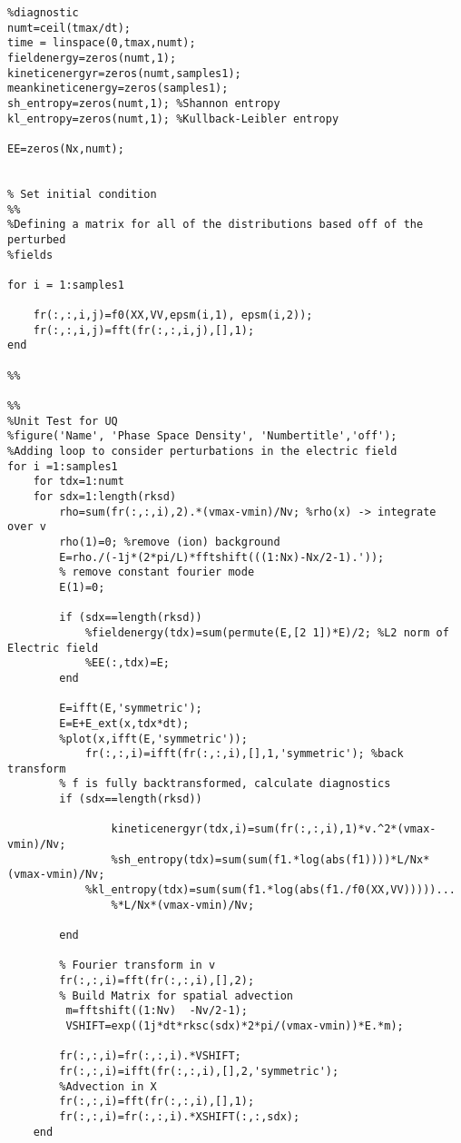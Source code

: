 \documentclass{article}
\begin{document}
\begin{lstlisting}
%diagnostic
numt=ceil(tmax/dt);
time = linspace(0,tmax,numt);
fieldenergy=zeros(numt,1);
kineticenergyr=zeros(numt,samples1);
meankineticenergy=zeros(samples1);
sh_entropy=zeros(numt,1); %Shannon entropy
kl_entropy=zeros(numt,1); %Kullback-Leibler entropy

EE=zeros(Nx,numt);


% Set initial condition
%%
%Defining a matrix for all of the distributions based off of the perturbed
%fields

for i = 1:samples1
   
    fr(:,:,i,j)=f0(XX,VV,epsm(i,1), epsm(i,2));
    fr(:,:,i,j)=fft(fr(:,:,i,j),[],1); 
end

%%

%%
%Unit Test for UQ
%figure('Name', 'Phase Space Density', 'Numbertitle','off');
%Adding loop to consider perturbations in the electric field
for i =1:samples1
    for tdx=1:numt
    for sdx=1:length(rksd)
        rho=sum(fr(:,:,i),2).*(vmax-vmin)/Nv; %rho(x) -> integrate over v
        rho(1)=0; %remove (ion) background
        E=rho./(-1j*(2*pi/L)*fftshift(((1:Nx)-Nx/2-1).'));
        % remove constant fourier mode
        E(1)=0;

        if (sdx==length(rksd))
            %fieldenergy(tdx)=sum(permute(E,[2 1])*E)/2; %L2 norm of Electric field
            %EE(:,tdx)=E;
        end

        E=ifft(E,'symmetric');
        E=E+E_ext(x,tdx*dt);
        %plot(x,ifft(E,'symmetric'));
            fr(:,:,i)=ifft(fr(:,:,i),[],1,'symmetric'); %back transform
        % f is fully backtransformed, calculate diagnostics
        if (sdx==length(rksd))
            
                kineticenergyr(tdx,i)=sum(fr(:,:,i),1)*v.^2*(vmax-vmin)/Nv;
                %sh_entropy(tdx)=sum(sum(f1.*log(abs(f1))))*L/Nx*(vmax-vmin)/Nv;
            %kl_entropy(tdx)=sum(sum(f1.*log(abs(f1./f0(XX,VV)))))...
                %*L/Nx*(vmax-vmin)/Nv;
            
        end

        % Fourier transform in v
        fr(:,:,i)=fft(fr(:,:,i),[],2);
        % Build Matrix for spatial advection
         m=fftshift((1:Nv)  -Nv/2-1);
         VSHIFT=exp((1j*dt*rksc(sdx)*2*pi/(vmax-vmin))*E.*m);

        fr(:,:,i)=fr(:,:,i).*VSHIFT;
        fr(:,:,i)=ifft(fr(:,:,i),[],2,'symmetric');
        %Advection in X
        fr(:,:,i)=fft(fr(:,:,i),[],1);
        fr(:,:,i)=fr(:,:,i).*XSHIFT(:,:,sdx);
    end
        

\end{lstlisting}
\end{document}
